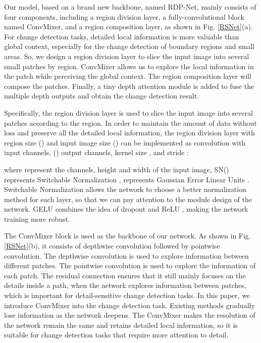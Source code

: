 \documentclass[lettersize,journal]{IEEEtran}
\begin{document}
\begin{figure*}[!t]
\centering
{}
\caption{The architecture of the proposed RDP-Net.
(a) is the backbone of RDP-Net.
(b) is ConvMixer.}
\label{RSNet}
\end{figure*}

Our model, based on a brand new backbone, named RDP-Net, mainly consists of four components, including a region division layer, a fully-convolutional block named ConvMixer, and a region composition layer, as shown in Fig. \ref{RSNet}(a).
For change detection tasks, detailed local information is more valuable than global context, especially for the change detection of boundary regions and small areas.
So, we design a region division layer to slice the input image into several small patches by region.
ConvMixer allows us to explore the local information in the patch while perceiving the global context.
The region composition layer will compose the patches. 
Finally, a tiny depth attention module is added to fuse the multiple depth outputs and obtain the change detection result.


Specifically, the region division layer is used to slice the input image into several patches according to the region.
In order to maintain the amount of data without loss and preserve all the detailed local information, the region division layer with region size () and input image size () can be implemented as convolution with  input channels,  () output channels, kernel size , and stride :

where  represent the channels, height and width of the input image, SN() represents Switchable Normalization \cite{luo2018differentiable},  represents Gaussian Error Linear Units \cite{hendrycks2016gaussian}.
Switchable Normalization allows the network to choose a better normalization method for each layer, so that we can pay attention to the module design of the network.
GELU combines the idea of dropout \cite{hinton2012improving} and ReLU \cite{nair2010rectified}, making the network training more robust.


The ConvMixer block \cite{anonymous2022patches} is used as the backbone of our network.
As shown in Fig. \ref{RSNet}(b), it consists of depthwise convolution followed by pointwise convolution.
The depthwise convolution is used to explore information between different patches.
The pointwise convolution is used to explore the information of each patch.
The residual connection ensures that it still mainly focuses on the details inside a path, when the network explores information between patches, which is important for detail-sensitive change detection tasks.
In this paper, we introduce ConvMixer into the change detection task.
Existing methods gradually lose information as the network deepens.
The ConvMixer makes the resolution of the network remain the same and retains detailed local information, so it is suitable for change detection tasks that require more attention to detail.
\end{document}
